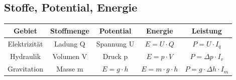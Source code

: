 \subsection*{Stoffe, Potential, Energie}

\begin{tabular}{|c|c|c|c|c|}
\hline 
Gebiet & Stoffmenge & Potential & Energie & Leistung\tabularnewline
\hline 
\hline 
Elektrizität & Ladung Q & Spannung U & $E=U\cdot Q$ & $P=U\cdot I_{q}$\tabularnewline
\hline 
Hydraulik & Volumen V & Druck p & $E=p\cdot V$ & $P=\Delta p\cdot I_{v}$\tabularnewline
\hline 
Gravitation & Masse m & $E=g\cdot h$ & $E=m\cdot g\cdot h$ & $P=g\cdot\Delta h\cdot I_{m}$\tabularnewline
\hline 
\end{tabular}
